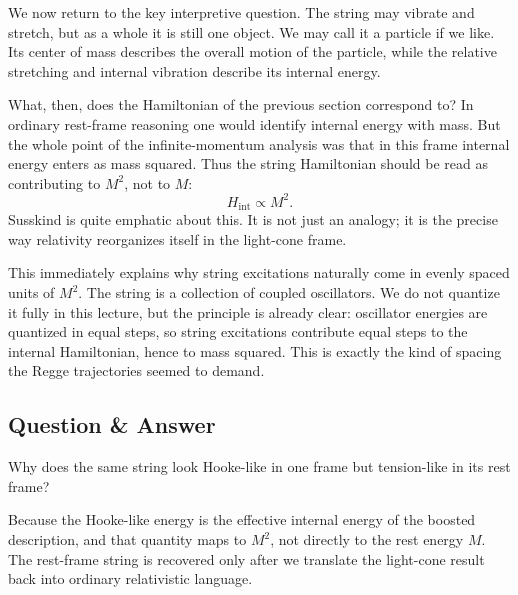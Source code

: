 We now return to the key interpretive question. The string may vibrate and stretch, but as a whole it is still one object. We may call it a particle if we like. Its center of mass describes the overall motion of the particle, while the relative stretching and internal vibration describe its internal energy.

What, then, does the Hamiltonian of the previous section correspond to? In ordinary rest-frame reasoning one would identify internal energy with mass. But the whole point of the infinite-momentum analysis was that in this frame internal energy enters as mass squared. Thus the string Hamiltonian should be read as contributing to \(M^2\), not to \(M\):
\begin{equation}
H_{\mathrm{int}} \propto M^2.
\end{equation}
Susskind is quite emphatic about this. It is not just an analogy; it is the precise way relativity reorganizes itself in the light-cone frame.

This immediately explains why string excitations naturally come in evenly spaced units of \(M^2\). The string is a collection of coupled oscillators. We do not quantize it fully in this lecture, but the principle is already clear: oscillator energies are quantized in equal steps, so string excitations contribute equal steps to the internal Hamiltonian, hence to mass squared. This is exactly the kind of spacing the Regge trajectories seemed to demand.

\subsection{Question \& Answer}

Why does the same string look Hooke-like in one frame but tension-like in its rest frame?

Because the Hooke-like energy is the effective internal energy of the boosted description, and that quantity maps to \(M^2\), not directly to the rest energy \(M\). The rest-frame string is recovered only after we translate the light-cone result back into ordinary relativistic language.

